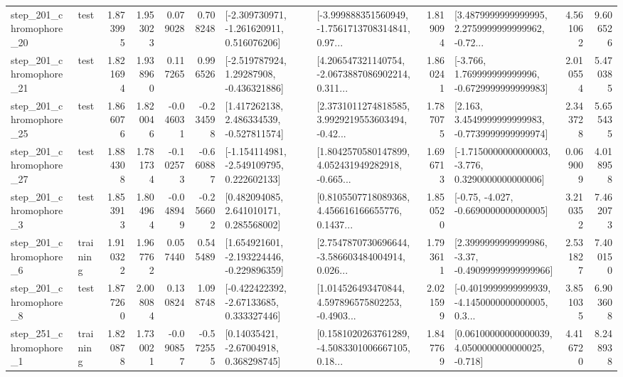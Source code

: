 \begin{tabular}{llrrrrllrlrr}
  step\_201\_chromophore\_20 &      test &      1.873995 &    1.953023 &      0.079028 &  0.708248 &   [-2.309730971, -1.261620911, 0.516076206] &  [-3.999888351560949, -1.7561713708314841, 0.97... &       1.819094 &  [3.4879999999999995, 2.2759999999999962, -0.72... &            4.561062 &          9.606526 \\
  step\_201\_chromophore\_21 &      test &      1.821694 &    1.938960 &      0.117265 &  0.996526 &    [-2.519787924, 1.29287908, -0.436321886] &  [4.206547321140754, -2.0673887086902214, 0.311... &       1.860241 &   [-3.766, 1.769999999999996, -0.6729999999999983] &            2.010554 &          5.470385 \\
  step\_201\_chromophore\_25 &      test &      1.866076 &    1.820046 &     -0.046031 & -0.234598 &    [1.417262138, 2.486334539, -0.527811574] &  [2.3731011274818585, 3.9929219553603494, -0.42... &       1.787075 &   [2.163, 3.4549999999999983, -0.7739999999999974] &            2.343728 &          5.655435 \\
  step\_201\_chromophore\_27 &      test &      1.884308 &    1.781734 &     -0.102573 & -0.660887 &   [-1.154114981, -2.549109795, 0.222602133] &  [1.8042570580147899, 4.052431949282918, -0.665... &       1.696713 &  [-1.7150000000000003, -3.776, 0.3290000000000006] &            0.069009 &          4.018958 \\
   step\_201\_chromophore\_3 &      test &      1.853913 &    1.804964 &     -0.048949 & -0.256602 &     [0.482094085, 2.641010171, 0.285568002] &  [0.8105507718089368, 4.456616166655776, 0.1437... &       1.850520 &               [-0.75, -4.027, -0.6690000000000005] &            3.210352 &          7.462073 \\
   step\_201\_chromophore\_6 &  training &      1.910322 &    1.967762 &      0.057440 &  0.545489 &   [1.654921601, -2.193224446, -0.229896359] &  [2.7547870730696644, -3.586603484004914, 0.026... &       1.793611 &  [2.3999999999999986, -3.37, -0.49099999999999966] &            2.531827 &          7.400150 \\
   step\_201\_chromophore\_8 &      test &      1.877260 &    2.008084 &      0.130824 &  1.098748 &    [-0.422422392, -2.67133685, 0.333327446] &  [1.014526493470844, 4.597896575802253, -0.4903... &       2.021599 &  [-0.4019999999999939, -4.1450000000000005, 0.3... &            3.851035 &          6.903608 \\
   step\_251\_chromophore\_1 &  training &      1.820878 &    1.730021 &     -0.090857 & -0.572555 &      [0.14035421, -2.67004918, 0.368298745] &  [0.1581020263761289, -4.5083301006667105, 0.18... &       1.847769 &  [0.06100000000000039, 4.0500000000000025, -0.718] &            4.416720 &          8.248938 \\

\end{tabular}
